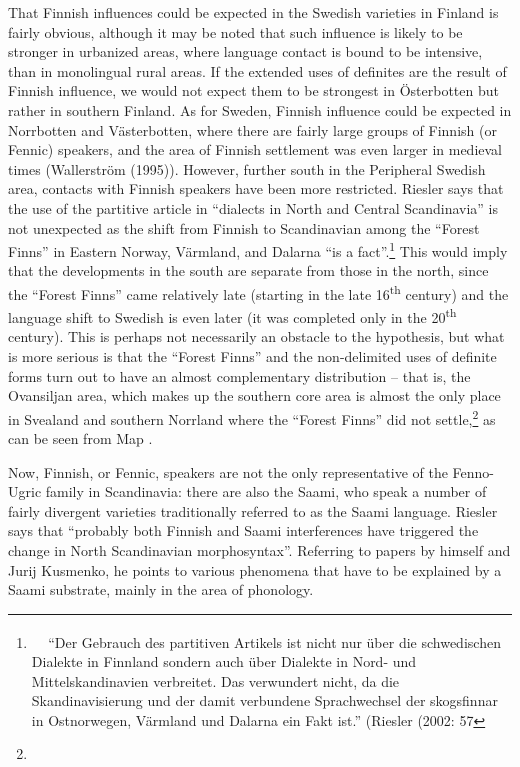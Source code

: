 \begin{stylefootnotetext}
That Finnish influences could be expected in the Swedish varieties in Finland is fairly obvious, although it may be noted that such influence is likely to be stronger in urbanized areas, where language contact is bound to be intensive, than in monolingual rural areas. If the extended uses of definites are the result of Finnish influence, we would not expect them to be strongest in Österbotten but rather in southern Finland. As for Sweden, Finnish influence could be expected in Norrbotten and Västerbotten, where there are fairly large groups of Finnish (or Fennic) speakers, and the area of Finnish settlement was even larger in medieval times (Wallerström (1995)). However, further south in the Peripheral Swedish area, contacts with Finnish speakers have been more restricted. Riesler says that the use of the partitive article in “dialects in North and Central Scandinavia” is not unexpected as the shift from Finnish to Scandinavian among the “Forest Finns” in Eastern Norway, Värmland, and Dalarna “is a fact”.\footnote{\textsuperscript{\ \ } “Der Gebrauch des partitiven Artikels ist nicht nur über die schwedischen Dialekte in Finnland sondern auch über Dialekte in Nord- und Mittelskandinavien verbreitet. Das verwundert nicht, da die Skandinavisierung und der damit verbundene Sprachwechsel der skogsfinnar in Ostnorwegen, Värmland und Dalarna ein Fakt ist.” (Riesler (2002: 57} This would imply that the developments in the south are separate from those in the north, since the “Forest Finns” came relatively late (starting in the late 16\textsuperscript{th }century) and the language shift to Swedish is even later (it was completed only in the 20\textsuperscript{th} century). This is perhaps not necessarily an obstacle to the hypothesis, but what is more serious is that the “Forest Finns” and the non-delimited uses of definite forms turn out to have an almost complementary distribution – that is, the Ovansiljan area, which makes up the southern core area is almost the only place in Svealand and southern Norrland where the “Forest Finns” did not settle,\footnote{} as can be seen from Map .

\end{stylefootnotetext}

\begin{styleBodytextC}
Now, Finnish, or Fennic, speakers are not the only representative of the Fenno-Ugric family in Scandinavia: there are also the Saami, who speak a number of fairly divergent varieties traditionally referred to as the Saami language. Riesler says that “probably both Finnish and Saami interferences have triggered the change in North Scandinavian morphosyntax”. Referring to papers by himself and Jurij Kusmenko, he points to various phenomena that have to be explained by a Saami substrate, mainly in the area of phonology.

\end{styleBodytextC}

